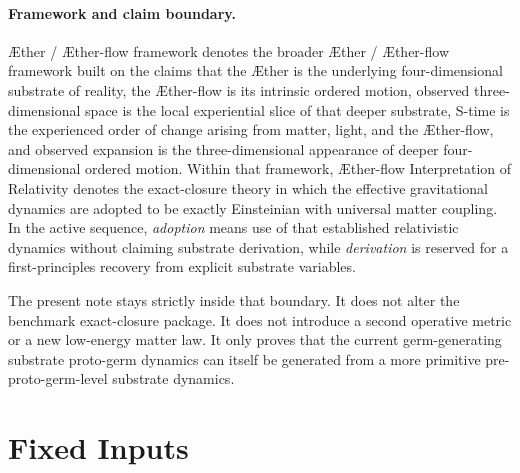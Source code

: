 \documentclass[11pt]{article}
\newcommand{\Aether}{\AE{}ther}
\newcommand{\Aflow}{\AE{}ther-flow}
\newcommand{\TheoryName}{\Aflow{} Interpretation of Relativity}
\newcommand{\TheoryProgram}{\Aether{} / \Aflow{} framework}
\begin{document}
\paragraph{Framework and claim boundary.}
\TheoryProgram{} denotes the broader \Aether{} / \Aflow{} framework built on the claims that the \Aether{} is the underlying four-dimensional substrate of reality, the \Aflow{} is its intrinsic ordered motion, observed three-dimensional space is the local experiential slice of that deeper substrate, S-time is the experienced order of change arising from matter, light, and the \Aflow{}, and observed expansion is the three-dimensional appearance of deeper four-dimensional ordered motion. Within that framework, \TheoryName{} denotes the exact-closure theory in which the effective gravitational dynamics are adopted to be exactly Einsteinian with universal matter coupling. In the active sequence, \emph{adoption} means use of that established relativistic dynamics without claiming substrate derivation, while \emph{derivation} is reserved for a first-principles recovery from explicit substrate variables.

The present note stays strictly inside that boundary. It does not alter the benchmark exact-closure package. It does not introduce a second operative metric or a new low-energy matter law. It only proves that the current germ-generating substrate proto-germ dynamics can itself be generated from a more primitive pre-proto-germ-level substrate dynamics.

\section{Fixed Inputs}
\end{document}

